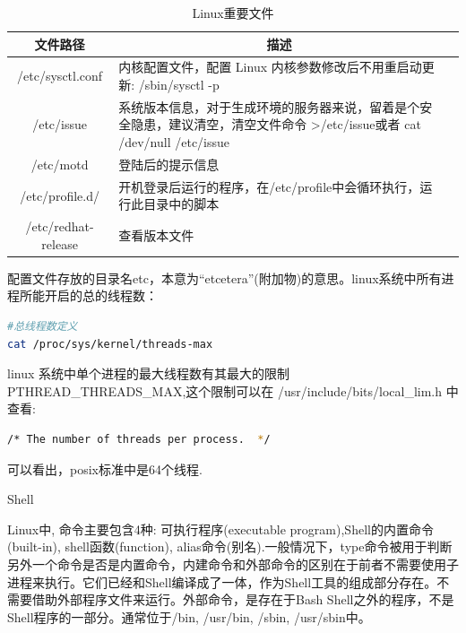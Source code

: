 \documentclass[12pt]{book}
\makeatletter
\numberwithin{dummy}{section}
\theoremstyle{ocrenumbox}
\theoremstyle{blacknumex}
\theoremstyle{blacknumbox}
\theoremstyle{ocrenum}
\renewcommand{\section}{\@startsection{section}{1}{\z@}
	{-4ex \@plus -1ex \@minus -.4ex}
	{1ex \@plus.2ex }
	{\normalfont\large\sffamily\bfseries}}
\makeatother
\begin{document}
\begin{table}
	\caption{Linux重要文件}
	\label{table:linuxconfigfile}
	\begin{center}
		\begin{tabular}{cp{10cm}c}
			\hline
			\multirow{1}{*}{文件路径}
			& \multicolumn{1}{c}{描述}  \\
			\hline			
			/etc/sysctl.conf  & 内核配置文件，配置 Linux 内核参数修改后不用重启动更新: /sbin/sysctl -p \\
			/etc/issue  & 系统版本信息，对于生成环境的服务器来说，留着是个安全隐患，建议清空，清空文件命令 >/etc/issue或者 cat /dev/null /etc/issue \\
			/etc/motd & 登陆后的提示信息\\
			/etc/profile.d/ & 开机登录后运行的程序，在/etc/profile中会循环执行，运行此目录中的脚本\\
			/etc/redhat-release & 查看版本文件\\
			\hline
		\end{tabular}	
	\end{center}
\end{table}

配置文件存放的目录名etc，本意为“etcetera”(附加物)的意思。linux系统中所有进程所能开启的总的线程数：

\begin{lstlisting}[language=Bash]
#总线程数定义
cat /proc/sys/kernel/threads-max
\end{lstlisting}

linux 系统中单个进程的最大线程数有其最大的限制 PTHREAD\_THREADS\_MAX,这个限制可以在 /usr/include/bits/local\_lim.h 中查看:

\begin{lstlisting}[language=Bash]
/* The number of threads per process.  */
\end{lstlisting}

可以看出，posix标准中是64个线程.

\section{Shell}

Linux中, 命令主要包含4种: 可执行程序(executable program),Shell的内置命令(built-in), shell函数(function), alias命令(别名).一般情况下，type命令被用于判断另外一个命令是否是内置命令，内建命令和外部命令的区别在于前者不需要使用子进程来执行。它们已经和Shell编译成了一体，作为Shell工具的组成部分存在。不需要借助外部程序文件来运行。外部命令，是存在于Bash Shell之外的程序，不是Shell程序的一部分。通常位于/bin, /usr/bin, /sbin, /usr/sbin中。
\end{document}
